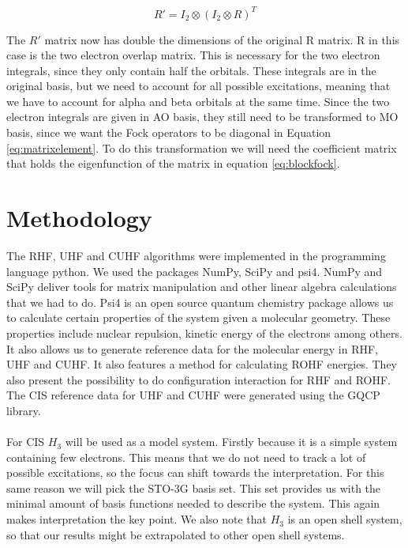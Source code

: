 \documentclass[twoside,twocolumn,9pt]{article}
\begin{document}
\begin{equation}\label{eq:kron}
  R' = I_2 \otimes (I_2 \otimes R)^T
\end{equation}

The $R'$ matrix now has double the dimensions of the original R matrix. R in this case is the two electron overlap matrix. This is necessary for the two electron integrals, since 
they only contain half the orbitals. These integrals are in the original basis, but we need to account for all possible excitations, meaning that we have to account for alpha and 
beta orbitals at the same time. Since the two electron integrals are given in AO basis, they still need to be transformed to MO basis, since we want the Fock operators to be 
diagonal in Equation \eqref{eq:matrixelement}. To do this transformation we will need the coefficient matrix that holds the eigenfunction of the matrix in equation 
\eqref{eq:blockfock}.

\section{Methodology}
\label{sec:method}
The RHF, UHF and CUHF algorithms were implemented in the programming language python. We used the packages NumPy, SciPy and psi4. NumPy and SciPy deliver tools for matrix manipulation
and other linear algebra calculations that we had to do. Psi4 is an open source quantum chemistry package allows us to calculate certain properties of the system given a molecular
geometry. These properties include nuclear repulsion, kinetic energy of the electrons among others. It also allows us to generate reference data for the molecular energy in RHF, UHF
and CUHF. It also features a method for calculating ROHF energies. They also present the possibility to do configuration interaction for RHF and ROHF. The CIS reference data for
UHF and CUHF were generated using the GQCP library.
\paragraph*{}
For CIS $H_3$ will be used as a model system. Firstly because it is a simple system containing few electrons. This means that we do not need to track a lot of possible excitations, so
the focus can shift towards the interpretation. For this same reason we will pick the STO-3G basis set. This set provides us with the minimal amount of basis functions needed to
describe the system. This again makes interpretation the key point. We also note that $H_3$ is an open shell system, so that our results might be extrapolated to other open shell
systems.
\end{document}
